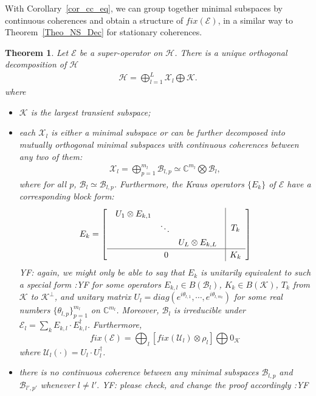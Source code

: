 \documentclass[journal]{IEEEtran}
\def\h{\ensuremath{\mathcal{H}}}
\def\u{\ensuremath{\mathcal{U}}}
\def\k{\ensuremath{\mathcal{K}}}
\def\u{\ensuremath{\mathcal{U}}}
\def\x{\ensuremath{\mathcal{X}}}
\def\b{\ensuremath{\mathcal{B}}}
\def\e{\ensuremath{\mathcal{E}}}
\def\k{\mathcal{K}}
\newtheorem{theorem}{Theorem}
\newcommand{\authorComment}[3]{\color{#1}#2: {#3} :#2\color{black}}
\newcommand{\yf}[1]{\authorComment{blue}{YF}{#1}}
\begin{document}
With Corollary~\ref{cor_cc_eq}, we can group together minimal subspaces by continuous coherences and obtain a structure of $fix(\e)$, in a similar way to Theorem~\ref{Theo_NS_Dec} for stationary coherences. 

\begin{theorem}\label{Theo_CC_dec}
  Let $\e$ be a super-operator on $\h$. There is a unique  orthogonal decomposition of $\h$
  \begin{eqnarray}\label{Eq_NS_dec_unique}
    \h=\bigoplus_{l=1}^{L}\x_l\bigoplus \k.
  \end{eqnarray}
  where \begin{itemize}
    \item[(1)] $\k$ is the largest transient subspace;
    \item[(2)] each $\x_l$ is either a minimal subspace or can be further decomposed into mutually orthogonal minimal subspaces with continuous coherences between any two of them:
    \begin{eqnarray}\label{Eq_NS_dec}
      \x_l=\bigoplus_{p=1}^{m_l}\b_{l,p}\simeq\mathbb{C}^{m_l}\bigotimes \b_l, 
    \end{eqnarray} 
   where for all $p$, $\b_l\simeq \b_{l,p}$. Furthermore, the Kraus operators $\{E_k\}$ of $\e$ have a corresponding block form:
      \begin{eqnarray}\label{Eq_CC_dec_Kraus}
    \renewcommand{\arraystretch}{1.2}
E_k=\left[\begin{array}{c|c}
  \begin{array}{ccc}
  U_{1}\otimes E_{k,1} &  &\\
   & \ddots &\\
   & & U_{L}\otimes E_{k,L}  
  \end{array} & T_k\\
  \hline
0&K_k
\end{array}\right]
  \end{eqnarray}
  \yf{again, we might only be able to say that $E_k$ is unitarily equivalent to such a special form}
for some operators $E_{k,l}\in B(\b_l)$, $K_k\in B(\k)$, $T_k$ from $\k$ to $\k^\perp$, and    unitary matrix $U_l=diag(e^{i\theta_{l,1}},\cdots,e^{i\theta_{l,m_l}})$ for some real numbers $\{\theta_{l,p}\}_{p=1}^{m_l}$ on $\mathbb{C}^{m_l}$. Moreover, $\b_l$ is irreducible under $\e_{l}=\sum_{k}E_{k,l}\cdot E_{k,l}^\dagger$. 
 Furthermore, 
$$fix(\e)=\bigoplus_l[fix(\u_{l})\otimes \rho_l]\bigoplus 0_\k$$ 
where $\u_l(\cdot)=U_l\cdot U_l^\dagger$. 

    \item[(3)] there is no continuous coherence between any minimal subspaces $\b_{l, p}$ and $\b_{l', p'}$ whenever $l\neq l'.$  \yf{please check, and change the proof accordingly}
      \end{itemize}
\end{theorem}
\end{document}
